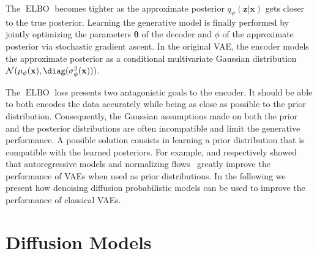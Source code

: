 The $\operatorname{ELBO}$ becomes tighter as the approximate posterior $q_\psi(\mathbf{z}|\mathbf{x})$ gets closer to the true posterior.
Learning the generative model is finally performed by jointly optimizing the parameters $\mathbf{\theta}$ of the decoder and $\phi$ of the approximate posterior via stochastic gradient ascent.
In the original VAE, the encoder models the approximate posterior as a conditional multivariate Gaussian distribution $\mathcal{N}(\mu_\phi(\mathbf{x}), \diag(\sigma_\phi^2(\mathbf{x})))$.

The $\operatorname{ELBO}$ loss presents two antagonistic goals to the encoder.
It should be able to both encodes the data accurately while being as close as possible to the prior distribution. Consequently, the Gaussian assumptions made on both the prior and the posterior distributions are often incompatible and limit the generative performance.
A possible solution consists in learning a prior distribution that is compatible with the learned posteriors. For example, \citet{PriorAutoreg2019} and \citet{PriorNF2017} respectively showed that autoregressive models and normalizing flows~\citep[NFs]{rezende2015variational} greatly improve the performance of VAEs when used as prior distributions.
In the following we present how denoising diffusion probabilistic models can be used to improve the performance of classical VAEs.

\section{Diffusion Models}


